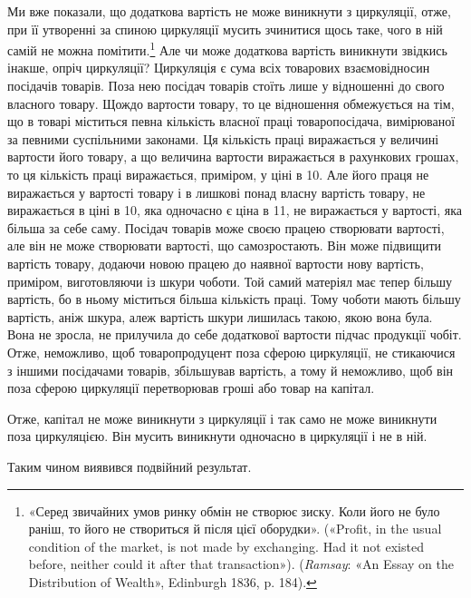 Ми вже показали, що додаткова вартість не може виникнути
з циркуляції, отже, при її утворенні за спиною циркуляції мусить
зчинитися щось таке, чого в ній самій не можна помітити.\footnote{
«Серед звичайних умов ринку обмін не створює зиску. Коли його
не було раніш, то його не створиться й після цієї оборудки». («Profit, in
the usual condition of the market, is not made by exchanging. Had it not
existed before, neither could it after that transaction»). (\emph{Ramsay}: «An
Essay on the Distribution of Wealth», Edinburgh 1836, p. 184).
} Але
чи може додаткова вартість виникнути звідкись інакше, опріч
циркуляції? Циркуляція є сума всіх товарових взаємовідносин
посідачів товарів. Поза нею посідач товарів стоїть лише у відношенні
до свого власного товару. Щождо вартости товару, то це
відношення обмежується на тім, що в товарі міститься певна
кількість власної праці товаропосідача, вимірюваної за певними
суспільними законами. Ця кількість праці виражається у величині
вартости його товару, а що величина вартости виражається
в рахункових грошах, то ця кількість праці виражається, приміром,
у ціні в 10. Але його праця не виражається
у вартості товару і в лишкові понад власну вартість товару,
не виражається в ціні в 10, яка одночасно є ціна в 11, не виражається
у вартості, яка більша за себе саму. Посідач товарів
може своєю працею створювати вартості, але він не може створювати
вартості, що самозростають. Він може підвищити вартість
товару, додаючи новою працею до наявної вартости нову вартість,
приміром, виготовляючи із шкури чоботи. Той самий матеріял
має тепер більшу вартість, бо в ньому міститься більша кількість
праці. Тому чоботи мають більшу вартість, аніж шкура, алеж вартість
шкури лишилась такою, якою вона була. Вона не зросла,
не прилучила до себе додаткової вартости підчас продукції чобіт.
Отже, неможливо, щоб товаропродуцент поза сферою циркуляції,
не стикаючися з іншими посідачами товарів, збільшував вартість,
а тому й неможливо, щоб він поза сферою циркуляції перетворював
гроші або товар на капітал.

Отже, капітал не може виникнути з циркуляції і так само не
може виникнути поза циркуляцією. Він мусить виникнути одночасно
в циркуляції і не в ній.

Таким чином виявився подвійний результат.

